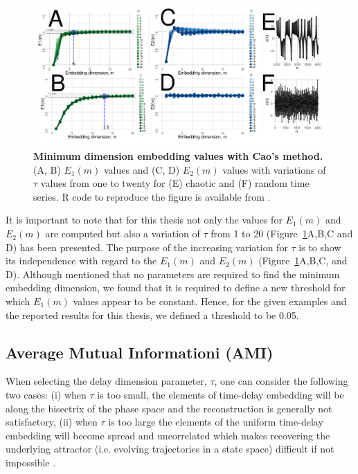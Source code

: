 \begin{figure}[!h]
  \centering
  \includegraphics[width=1.0\textwidth]{cao}
    \caption{
	{\bf Minimum dimension embedding values with Cao's method.} 
	(A, B) $E_1 (m)$ values and (C, D) $E_2(m)$ values 
	with variations of $\tau$ values from one to twenty
	for (E) chaotic and (F) random time series.
	R code to reproduce the figure is available from \cite{hwum2018}.
        }
    \label{fig:e1e2}
\end{figure}

It is important to note that for this thesis not only the values for 
$E_1(m)$ and $E_2(m)$ are computed but also a variation of $\tau$ from 
1 to 20 (Figure~\ref{fig:e1e2}A,B,C and D) has been presented. 
The purpose of the increasing variation for $\tau$ is to show its independence 
with regard to the $E_1(m)$ and $E_2(m)$ (Figure~\ref{fig:e1e2}A,B,C, and D).
Although \cite{Cao1997} mentioned that no parameters are required to find
the minimum embedding dimension, we found that it is required to define a 
new threshold for which $E_1(m)$ values appear to be constant. 
Hence, for the given examples and the reported results for this thesis, 
we defined a threshold to be 0.05. 


\subsection{Average Mutual Informationi (AMI)}
When selecting the delay dimension parameter, $\tau$, one can consider the 
following two cases:
(i) when $\tau$ is too small, the elements of time-delay embedding will be 
along the bisectrix of the phase space and the reconstruction is generally 
not satisfactory, 
(ii) when $\tau$ is too large the elements of the uniform 
time-delay embedding will become spread and uncorrelated which makes 
recovering the underlying attractor (i.e. evolving trajectories in a 
state space) difficult if not impossible 
\citep{casdagli1991, emrani2014a, garcia2005e71}.

